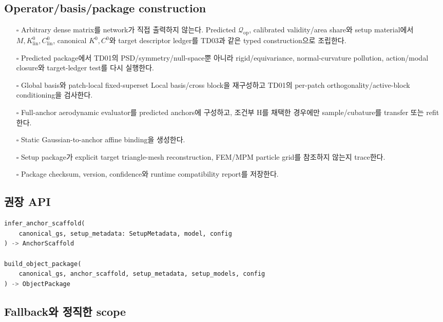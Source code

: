\documentclass[10pt,a4paper]{article}
\newcommand{\todo}{\textcolor{TodoGray}{\(\square\)}}
\begin{document}
\subsection*{Operator/basis/package construction}

\begin{itemize}
  \item[\todo] Arbitrary dense matrix를 network가 직접 출력하지 않는다.
  Predicted \(\mathcal Q_{\mathrm{op}}\), calibrated validity/area share와 setup material에서
  \(M,K_{\mathrm{lin}}^0,C_{\mathrm{lin}}^0\), canonical
  \(K^0,C^0\)와 target descriptor ledger를 TD03과 같은 typed construction으로 조립한다.
  \item[\todo] Predicted package에서 TD01의 PSD/symmetry/null-space뿐 아니라
  rigid/equivariance, normal-curvature pollution, action/modal closure와 target-ledger test를 다시 실행한다.
  \item[\todo] Global basis와 patch-local fixed-superset Local basis/cross block을 재구성하고 TD01의 per-patch orthogonality/active-block conditioning을 검사한다.
  \item[\todo] Full-anchor aerodynamic evaluator를 predicted anchors에 구성하고, 조건부 H를 채택한 경우에만 sample/cubature를 transfer 또는 refit한다.
  \item[\todo] Static Gaussian-to-anchor affine binding을 생성한다.
  \item[\todo] Setup package가 explicit target triangle-mesh reconstruction, FEM/MPM particle grid를 참조하지 않는지 trace한다.
  \item[\todo] Package checksum, version, confidence와 runtime compatibility report를 저장한다.
\end{itemize}

\subsection*{권장 API}

\begin{lstlisting}[language=Python]
infer_anchor_scaffold(
    canonical_gs, setup_metadata: SetupMetadata, model, config
) -> AnchorScaffold

build_object_package(
    canonical_gs, anchor_scaffold, setup_metadata, setup_models, config
) -> ObjectPackage
\end{lstlisting}

\subsection*{Fallback와 정직한 scope}
\end{document}
